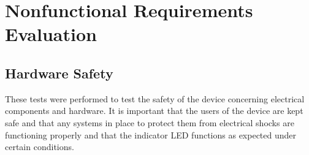 \documentclass[12pt, titlepage]{article}
\begin{document}
\section{Nonfunctional Requirements Evaluation}
\subsection{Hardware Safety }

These tests were performed to test the safety of the device concerning electrical components and hardware. It is important that the users of the device are kept safe and that any systems in place to protect them from electrical shocks are functioning properly and that the indicator LED functions as expected under certain conditions.
\end{document}
